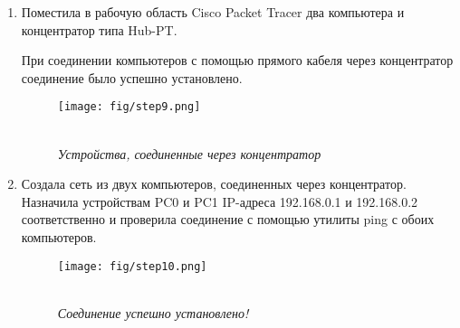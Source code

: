 \begin{enumerate}
\begin{figure}[h!]
\begin{multicols}{2}
\hfill
\texttt{[image: fig/step8.png]}
\hfill
\caption*{\\[-40 pt] \it С IP-адресом 192.168.0.3 всё хорошо}
\label{figLeft}
\hfill
\texttt{[image: fig/step8b.png]}
\hfill
\caption*{\\[-40 pt] \it А вот с 192.168.1.3 всё сломалось}
\label{figRight}
\end{multicols}
\end{figure}
\item Поместила в рабочую область Cisco Packet Tracer два компьютера и
концентратор типа Hub-PT.

При соединении компьютеров с помощью прямого кабеля через концентратор соединение было успешно установлено. \\
  \begin{figure}[h!]
    \centering
    \texttt{[image: fig/step9.png]}
    \caption*{\\[-40 pt] \it Устройства, соединенные через концентратор}
  \end{figure}

\item Создала сеть из двух компьютеров, соединенных через
концентратор. Назначила устройствам PC0 и PC1 IP-адреса 192.168.0.1 и 192.168.0.2 соответственно и проверила соединение с
помощью утилиты ping с обоих компьютеров.\\
  \begin{figure}[h!]
    \centering
    \texttt{[image: fig/step10.png]}
    \caption*{\\[-40 pt] \it Соединение успешно установлено!}
  \end{figure}

\end{enumerate}